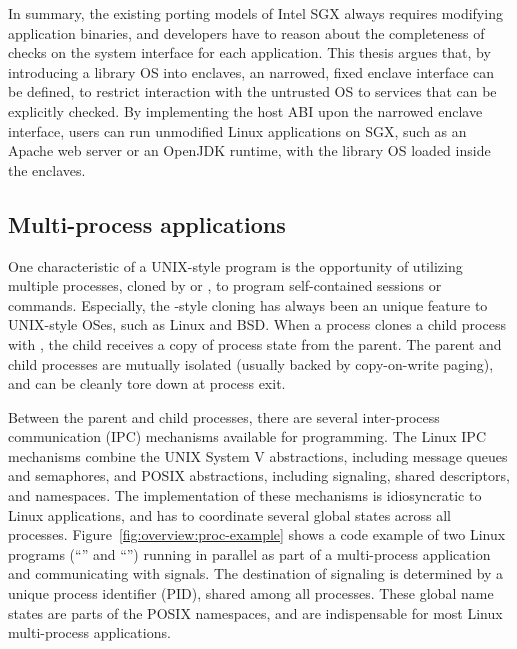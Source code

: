 In summary, the existing porting models of Intel SGX always requires modifying application binaries, and developers have to reason about the completeness of checks on the system interface for each application.
This thesis argues that, by introducing a library OS into enclaves,
an narrowed, fixed enclave interface can be defined, to restrict interaction with the untrusted OS to services that can be explicitly checked.
By implementing the \graphene{} host ABI upon the narrowed enclave interface,
users can run unmodified Linux applications on SGX, such as an Apache web server or an OpenJDK runtime,
with the \graphene{} library OS loaded inside the enclaves.



\subsection{Multi-process applications}
\label{sec:intro:multiproc}


One characteristic of a UNIX-style program is the opportunity of utilizing multiple processes, cloned by  or ,
to program self-contained sessions or commands.
Especially, the -style cloning has always been an unique feature to UNIX-style OSes, such as Linux and BSD. 
When a process clones a child process with , the child receives a copy of process state from the parent. The parent and child processes are mutually isolated (usually backed by copy-on-write paging), and can be cleanly tore down at process exit.


Between the parent and child processes, there are several inter-process communication (IPC) mechanisms available for programming.
The Linux IPC mechanisms combine the UNIX System V abstractions, including message queues and semaphores,
and POSIX abstractions, including signaling, shared descriptors, and namespaces.
The implementation of these mechanisms is idiosyncratic to Linux applications, and has to coordinate several global states across all processes.
Figure~\ref{fig:overview:proc-example} shows a code example of
two Linux programs (``'' and ``'')
running in parallel as part of a multi-process application and communicating with signals.
The destination of signaling is determined by a unique process identifier (PID),
shared among all processes.
These global name states are parts of the POSIX namespaces, and are indispensable for most Linux multi-process applications.

